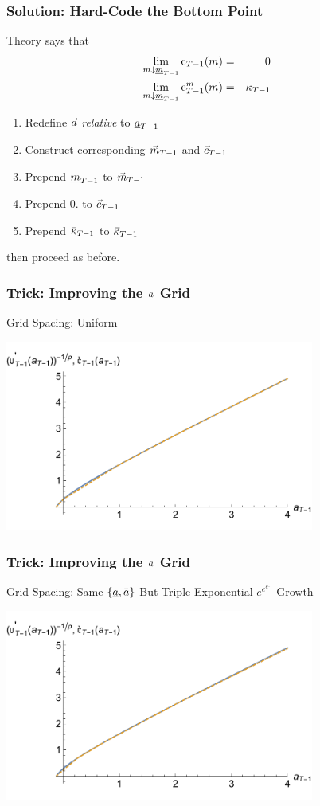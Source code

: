 \documentclass{beamer}
\begin{document}
\begin{frame}
\frametitle{Solution: Hard-Code the Bottom Point}

Theory says that
\begin{eqnarray}
  \lim_{m \downarrow \underline{m}_{T-1}} \mathrm{c}_{T-1}(m) & = & 0
\\ \lim_{m \downarrow \underline{m}_{T-1}} \mathrm{c}_{T-1}^{m}(m) & = & \bar{\kappa}_{T-1}
\end{eqnarray}

\medskip 

\begin{enumerate}
\item Redefine $\vec{a}$ {\it relative} to $\uline{\aRat}_{T-1}$
\item Construct corresponding $\vec{m}_{T-1}$ and $\vec{c}_{T-1}$
\item Prepend $\uline{\mRat}_{T-1}$ to $\vec{m}_{T-1}$
\item Prepend $0.$ to $\vec{c}_{T-1}$
\item Prepend $\bar{\kappa}_{T-1}$ to $\vec{\kappa}_{T-1}$
\end{enumerate}
then proceed as before.

\end{frame}

\begin{frame}
\frametitle{Trick: Improving the $a$ Grid}
Grid Spacing: Uniform

\includegraphics[width=4in]{./Figures/GothVInvVSGothC.pdf}

\end{frame}


\begin{frame}
\frametitle{Trick: Improving the $a$ Grid}
Grid Spacing: Same $\{\uline{\aRat},\bar{\aRat}\}$ But Triple Exponential $e^{e^{e^{...}}}$ Growth

\includegraphics[width=4in]{./Figures/GothVInvVSGothCEEE.pdf}

\end{frame}
\end{document}
